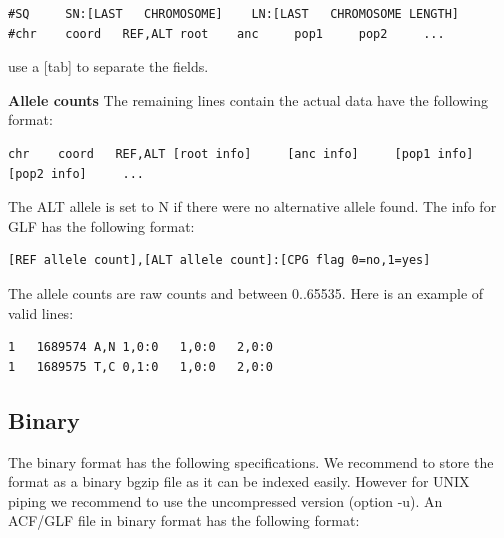 \documentclass[a4paper]{article}
\begin{document}

\begin{lstlisting}
#SQ     SN:[LAST   CHROMOSOME]    LN:[LAST   CHROMOSOME LENGTH]
#chr    coord   REF,ALT root    anc     pop1     pop2     ...
\end{lstlisting}

\noindent use a [tab] to separate the fields. 

\noindent \textbf{Allele counts}
\noindent The remaining lines contain the actual data have the following format:

\begin{lstlisting}
chr    coord   REF,ALT [root info]     [anc info]     [pop1 info]     [pop2 info]     ...
\end{lstlisting}

\noindent  The ALT allele is set to N if there were no alternative allele found. The info for GLF has the following format:

\begin{lstlisting}
[REF allele count],[ALT allele count]:[CPG flag 0=no,1=yes]
\end{lstlisting}

\noindent  The allele counts are raw counts and between 0..65535. Here is an example of valid lines:

\begin{lstlisting}
1	1689574	A,N	1,0:0	1,0:0	2,0:0
1	1689575	T,C	0,1:0	1,0:0	2,0:0
\end{lstlisting}



\subsection{Binary}


\noindent The binary format has the following specifications. We recommend to store the format as a binary bgzip file as it can be indexed easily. However for UNIX piping we recommend to use the uncompressed version (option -u). An ACF/GLF file in binary format has the following format:

\end{document}
